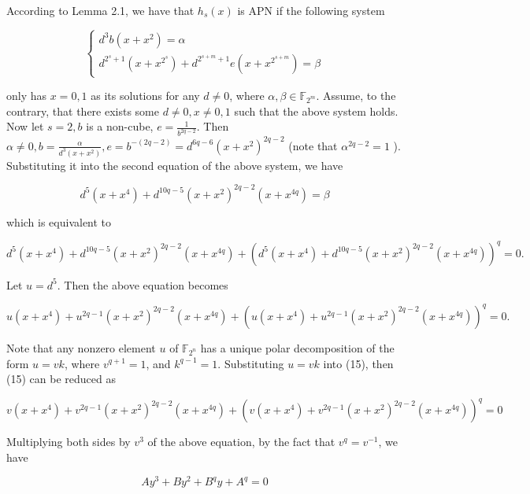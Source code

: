 \documentclass[10pt]{article}
\begin{document}
According to Lemma 2.1, we have that $h_{s}(x)$ is APN if the following system

$$
\left\{\begin{array}{l}
d^{3} b\left(x+x^{2}\right)=\alpha \\
d^{2^{s}+1}\left(x+x^{2^{s}}\right)+d^{2^{s+m}+1} e\left(x+x^{2^{s+m}}\right)=\beta
\end{array}\right.
$$

only has $x=0,1$ as its solutions for any $d \neq 0$, where $\alpha, \beta \in \mathbb{F}_{2^{m}}$. Assume, to the contrary, that there exists some $d \neq 0, x \neq 0,1$ such that the above system holds. Now let $s=2, b$ is a non-cube, $e=\frac{1}{b^{2 q-2}}$. Then $\alpha \neq 0, b=\frac{\alpha}{d^{3}\left(x+x^{2}\right)}, e=b^{-(2 q-2)}=d^{6 q-6}\left(x+x^{2}\right)^{2 q-2}$ (note that $\alpha^{2 q-2}=1$ ). Substituting it into the second equation of the above system, we have

$$
d^{5}\left(x+x^{4}\right)+d^{10 q-5}\left(x+x^{2}\right)^{2 q-2}\left(x+x^{4 q}\right)=\beta
$$

which is equivalent to


\begin{equation*}
d^{5}\left(x+x^{4}\right)+d^{10 q-5}\left(x+x^{2}\right)^{2 q-2}\left(x+x^{4 q}\right)+\left(d^{5}\left(x+x^{4}\right)+d^{10 q-5}\left(x+x^{2}\right)^{2 q-2}\left(x+x^{4 q}\right)\right)^{q}=0 . \tag{14}
\end{equation*}


Let $u=d^{5}$. Then the above equation becomes


\begin{equation*}
u\left(x+x^{4}\right)+u^{2 q-1}\left(x+x^{2}\right)^{2 q-2}\left(x+x^{4 q}\right)+\left(u\left(x+x^{4}\right)+u^{2 q-1}\left(x+x^{2}\right)^{2 q-2}\left(x+x^{4 q}\right)\right)^{q}=0 . \tag{15}
\end{equation*}


Note that any nonzero element $u$ of $\mathbb{F}_{2^{n}}$ has a unique polar decomposition of the form $u=v k$, where $v^{q+1}=1$, and $k^{q-1}=1$. Substituting $u=v k$ into (15), then (15) can be reduced as

$$
v\left(x+x^{4}\right)+v^{2 q-1}\left(x+x^{2}\right)^{2 q-2}\left(x+x^{4 q}\right)+\left(v\left(x+x^{4}\right)+v^{2 q-1}\left(x+x^{2}\right)^{2 q-2}\left(x+x^{4 q}\right)\right)^{q}=0
$$

Multiplying both sides by $v^{3}$ of the above equation, by the fact that $v^{q}=v^{-1}$, we have

$$
A y^{3}+B y^{2}+B^{q} y+A^{q}=0
$$
\end{document}
